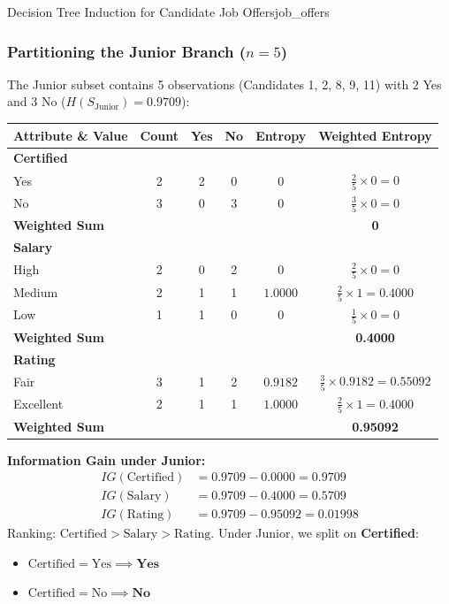 \begin{example}{Decision Tree Induction for Candidate Job Offers}{job_offers}
\subsubsection{Partitioning the Junior Branch (\texorpdfstring{$n = 5$}{n = 5})}
The Junior subset contains 5 observations (Candidates 1, 2, 8, 9, 11) with $2$ Yes and $3$ No ($H(S_{\text{Junior}}) = 0.9709$):
\begin{center}\renewcommand{\arraystretch}{1.35}
\begin{tabular}{lccccc}
\toprule
\textbf{Attribute \& Value} & \textbf{Count} & \textbf{Yes} & \textbf{No} & \textbf{Entropy} & \textbf{Weighted Entropy} \\
\midrule
\textbf{Certified} & & & & & \\
Yes & 2 & 2 & 0 & $0$ & $\frac{2}{5} \times 0 = 0$ \\
No  & 3 & 0 & 3 & $0$ & $\frac{3}{5} \times 0 = 0$ \\
\textbf{Weighted Sum} & & & & & \textbf{0} \\
\midrule
\textbf{Salary} & & & & & \\
High & 2 & 0 & 2 & $0$ & $\frac{2}{5} \times 0 = 0$ \\
Medium & 2 & 1 & 1 & $1.0000$ & $\frac{2}{5} \times 1 = 0.4000$ \\
Low & 1 & 1 & 0 & $0$ & $\frac{1}{5} \times 0 = 0$ \\
\textbf{Weighted Sum} & & & & & \textbf{0.4000} \\
\midrule
\textbf{Rating} & & & & & \\
Fair & 3 & 1 & 2 & $0.9182$ & $\frac{3}{5} \times 0.9182 = 0.55092$ \\
Excellent & 2 & 1 & 1 & $1.0000$ & $\frac{2}{5} \times 1 = 0.4000$ \\
\textbf{Weighted Sum} & & & & & \textbf{0.95092} \\
\bottomrule
\end{tabular}
\end{center}

\textbf{Information Gain under Junior:}
\begin{align*}
    IG(\text{Certified}) &= 0.9709 - 0.0000 = \mathbf{0.9709} \\[4pt]
    IG(\text{Salary}) &= 0.9709 - 0.4000 = 0.5709 \\[4pt]
    IG(\text{Rating}) &= 0.9709 - 0.95092 = 0.01998
\end{align*}
Ranking: $\text{Certified} > \text{Salary} > \text{Rating}$.
Under Junior, we split on \textbf{Certified}:
\begin{itemize}
    \item $\text{Certified} = \text{Yes} \implies \mathbf{Yes}$
    \item $\text{Certified} = \text{No} \implies \mathbf{No}$
\end{itemize}


\end{example}
